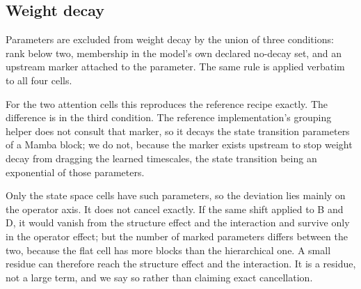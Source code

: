 \subsection{Weight decay}

Parameters are excluded from weight decay by the union of three conditions:
rank below two, membership in the model's own declared no-decay set, and an
upstream marker attached to the parameter. The same rule is applied verbatim
to all four cells.

For the two attention cells this reproduces the reference recipe exactly.
The difference is in the third condition. The reference implementation's
grouping helper does not consult that marker, so it decays the state
transition parameters of a Mamba block; we do not, because the marker exists
upstream to stop weight decay from dragging the learned timescales, the state
transition being an exponential of those parameters.

Only the state space cells have such parameters, so the deviation lies mainly
on the operator axis. It does not cancel exactly. If the same shift applied
to B and D, it would vanish from the structure effect and the interaction and
survive only in the operator effect; but the number of marked parameters
differs between the two, because the flat cell has more blocks than the
hierarchical one. A small residue can therefore reach the structure effect
and the interaction. It is a residue, not a large term, and we say so rather
than claiming exact cancellation.
